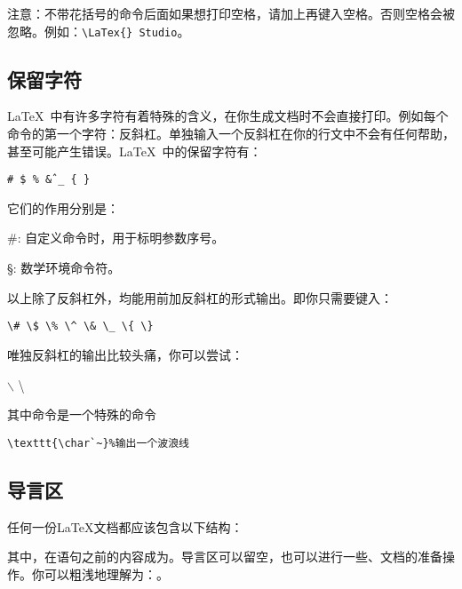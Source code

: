 注意：不带花括号的命令后面如果想打印空格，请加上{\color{cyan}{一对内部为空的花括号}}再键入空格。否则空格会被忽略。例如：\verb+\LaTex{} Studio+。
\subsection{保留字符}
\LaTeX\ 中有许多字符有着特殊的含义，在你生成文档时不会直接打印。例如每个命令的第一个字符：反斜杠。单独输入一个反斜杠在你的行文中不会有任何帮助，甚至可能产生错误。\LaTeX\ 中的保留字符有：
\begin{center}
	\texttt{\# \$ \% \^ \& \_ \{ \} }
\end{center}

它们的作用分别是：
\begin{para}
\item[\#{}:]自定义命令时，用于标明参数序号。
\item[\S{}:]数学环境命令符。
\end{para}

以上除了反斜杠外，均能用前加反斜杠的形式输出。即你只需要键入：
\begin{center}
\verb|\# \$ \% \^ \& \_ \{ \}|
\end{center}

唯独反斜杠的输出比较头痛，你可以尝试：
\begin{codeshow}
$\backslash$ \textbackslash
\texttt{}
\end{codeshow}

其中命令是一个特殊的命令
\begin{verbatim}
\texttt{\char`~}%输出一个波浪线
\end{verbatim}

\subsection{导言区}
任何一份\LaTeX{}文档都应该包含以下结构：
其中，在语句之前的内容成为。导言区可以留空，也可以进行一些、文档的准备操作。你可以粗浅地理解为：。\\

